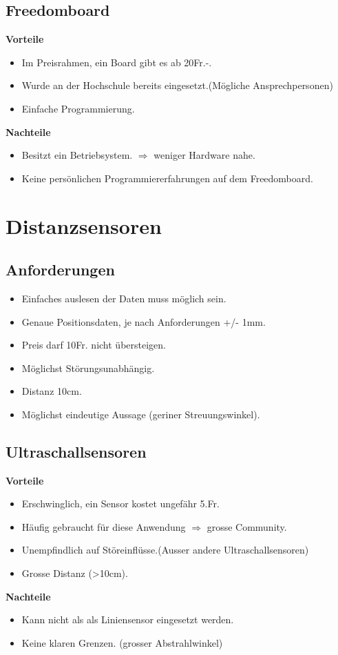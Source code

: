 \subsection{Freedomboard}
\textbf {Vorteile}
\begin{itemize}
\item Im Preisrahmen, ein Board gibt es ab 20Fr.-.
\item Wurde an der Hochschule bereits eingesetzt.(Mögliche Ansprechpersonen)
\item Einfache Programmierung.\\
\end{itemize}
\textbf {Nachteile}
\begin{itemize}
\item Besitzt ein Betriebsystem. $\Rightarrow$ weniger Hardware nahe.
\item Keine persönlichen Programmiererfahrungen auf dem Freedomboard.
\end{itemize}

\section*{Distanzsensoren}
\subsection{Anforderungen}
\begin{itemize}
\item Einfaches auslesen der Daten muss möglich sein.
\item Genaue Positionsdaten, je nach Anforderungen +/- 1mm.
\item Preis darf 10Fr. nicht übersteigen.
\item Möglichst Störungsunabhängig.
\item Distanz 10cm.
\item Möglichst eindeutige Aussage (geriner Streuungswinkel).
\end{itemize}

\subsection{Ultraschallsensoren}
\textbf {Vorteile}
\begin{itemize}
\item Erschwinglich, ein Sensor kostet ungefähr 5.Fr.
\item Häufig gebraucht für diese Anwendung $\Rightarrow$ grosse Community.
\item Unempfindlich auf Störeinflüsse.(Ausser andere Ultraschallsensoren)
\item Grosse Distanz (>10cm).\\
\end{itemize}
\textbf {Nachteile}
\begin{itemize}
\item Kann nicht als als Liniensensor eingesetzt werden.
\item Keine klaren Grenzen. (grosser Abstrahlwinkel)
\end{itemize}

